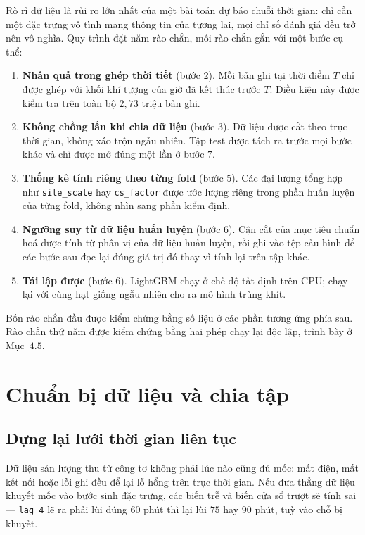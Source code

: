 \documentclass[12pt,a4paper]{article}
\begin{document}
Rò rỉ dữ liệu là rủi ro lớn nhất của một bài toán dự báo chuỗi thời gian: chỉ cần một
đặc trưng vô tình mang thông tin của tương lai, mọi chỉ số đánh giá đều trở nên vô
nghĩa. Quy trình đặt năm rào chắn, mỗi rào chắn gắn với một bước cụ thể:

\begin{enumerate}
    \item \textbf{Nhân quả trong ghép thời tiết} (bước $2$). Mỗi bản ghi tại thời điểm
    $T$ chỉ được ghép với khối khí tượng của giờ đã kết thúc trước $T$. Điều kiện này
    được kiểm tra trên toàn bộ $2{,}73$ triệu bản ghi.

    \item \textbf{Không chồng lấn khi chia dữ liệu} (bước $3$). Dữ liệu được cắt theo
    trục thời gian, không xáo trộn ngẫu nhiên. Tập test được tách ra trước mọi bước
    khác và chỉ được mở đúng một lần ở bước $7$.

    \item \textbf{Thống kê tính riêng theo từng fold} (bước $5$). Các đại lượng tổng
    hợp như \texttt{site\_scale} hay \texttt{cs\_factor} được ước lượng riêng trong
    phần huấn luyện của từng fold, không nhìn sang phần kiểm định.

    \item \textbf{Ngưỡng suy từ dữ liệu huấn luyện} (bước $6$). Cận cắt của mục tiêu
    chuẩn hoá được tính từ phân vị của dữ liệu huấn luyện, rồi ghi vào tệp cấu hình để
    các bước sau đọc lại đúng giá trị đó thay vì tính lại trên tập khác.

    \item \textbf{Tái lập được} (bước $6$). LightGBM chạy ở chế độ tất định trên CPU;
    chạy lại với cùng hạt giống ngẫu nhiên cho ra mô hình trùng khít.
\end{enumerate}

Bốn rào chắn đầu được kiểm chứng bằng số liệu ở các phần tương ứng phía sau. Rào chắn
thứ năm được kiểm chứng bằng hai phép chạy lại độc lập, trình bày ở Mục~$4.5$.

\section{Chuẩn bị dữ liệu và chia tập}

\subsection{Dựng lại lưới thời gian liên tục}

Dữ liệu sản lượng thu từ công tơ không phải lúc nào cũng đủ mốc: mất điện, mất kết nối
hoặc lỗi ghi đều để lại lỗ hổng trên trục thời gian. Nếu đưa thẳng dữ liệu khuyết mốc
vào bước sinh đặc trưng, các biến trễ và biến cửa sổ trượt sẽ tính sai --- \texttt{lag\_4}
lẽ ra phải lùi đúng $60$ phút thì lại lùi $75$ hay $90$ phút, tuỳ vào chỗ bị khuyết.
\end{document}
